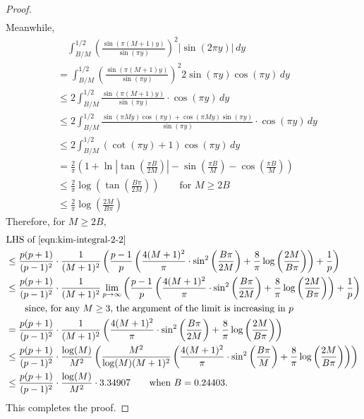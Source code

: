 \documentclass[11pt,letterpaper,reqno]{amsart}
\theoremstyle{definition}
\numberwithin{equation}{section}
\numberwithin{figure}{section}
\numberwithin{table}{section}
\begin{document}
\begin{proof}
\begin{align}
    \end{align}
Meanwhile,
\begin{align}
    &\quad \int_{B/M}^{1/2} \left( \frac{\sin \left( \pi (M + 1) y \right)}{\sin \left( \pi y \right)} \right)^2  |\sin(2\pi y )|  \, dy \\
    &= \int_{B/M}^{1/2} \left( \frac{\sin \left( \pi (M + 1) y \right)}{\sin \left( \pi y \right)} \right)^2  2 \sin(\pi y) \cos(\pi y)  \, dy\\
    &\leq 2\int_{B/M}^{1/2}  \frac{\sin \left( \pi (M + 1) y \right)}{\sin \left( \pi y \right)} \cdot  \cos(\pi y)  \, dy\\
    &\leq 2\int_{B/M}^{1/2}  \frac{ \sin(\pi M y) \cos (\pi y) + \cos(\pi M y) \sin(\pi y)}{\sin \left( \pi y \right)} \cdot  \cos(\pi y)  \, dy\\
    &\leq 2\int_{B/M}^{1/2}  \left( \cot(\pi y) + 1 \right)  \cos(\pi y)  \, dy\\
    &= \frac{2}{\pi} \left( 1 + \ln \left| \tan \left( \frac{\pi B}{2M} \right) \right| - \sin \left( \frac{\pi B}{M} \right) - \cos \left( \frac{\pi B}{M} \right)  \right)\\
    &\leq \frac{2}{\pi} \log \left( \tan \left( \frac{B \pi}{2M} \right) \right)  \qquad \text{for $M \geq 2B$}\\
    &\leq \frac{2}{\pi} \log \left( \frac{2M}{B\pi} \right) \label{eqn:kim-2.2-2}
\end{align}
Therefore, for $M \geq 2B,$
\begin{align}
    &\text{LHS of \eqref{eqn:kim-integral-2-2}} \\
    &\leq \frac{p(p + 1)}{(p - 1)^2} \cdot \frac{1}{(M + 1)^2} \left( \frac{p - 1}{p} \left( \frac{4(M + 1)^2}{\pi} \cdot \sin^2\left( \frac{B \pi}{2M}  \right) + \frac{8}{\pi} \log \left( \frac{2M}{B\pi} \right) \right) + \frac{1}{p} \right)\\
    &\leq \frac{p(p + 1)}{(p - 1)^2} \cdot \frac{1}{(M + 1)^2} \lim_{p \rightarrow \infty}\left( \frac{p - 1}{p} \left( \frac{4(M + 1)^2}{\pi} \cdot \sin^2\left( \frac{B \pi}{2M}  \right) + \frac{8}{\pi} \log \left( \frac{2M}{B\pi} \right) \right) + \frac{1}{p} \right)\\
    & \qquad \text{since, for any $M \geq 3$, the argument of the limit is increasing in $p$}\\
    &= \frac{p(p + 1)}{(p - 1)^2} \cdot \frac{1}{(M + 1)^2}  \left( \frac{4(M + 1)^2}{\pi} \cdot \sin^2\left( \frac{B \pi}{2M}  \right) + \frac{8}{\pi} \log \left( \frac{2M}{B\pi} \right) \right) \\
    &\leq \frac{p(p + 1)}{(p - 1)^2} \cdot \frac{\log(M)}{M^2} \left(  \frac{M^2}{\log(M) (M + 1)^2} \left(  \frac{4(M + 1)^2}{\pi} \cdot \sin^2\left( \frac{B \pi}{M}  \right) + \frac{8}{\pi} \log \left( \frac{2M}{B\pi} \right) \right) \right)\\
    &\leq \frac{p(p + 1)}{(p - 1)^2} \cdot \frac{\log(M)}{M^2} \cdot 3.34907 \qquad \text{when $B = 0.24403$}.
\end{align}
This completes the proof.
\end{proof}
\end{document}
